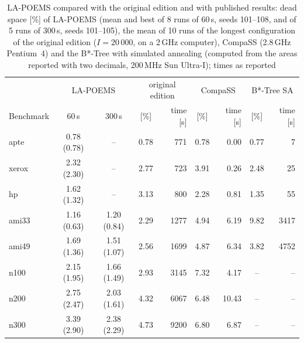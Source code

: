 \begin{table}
\centering
\small
\begin{tabular}{@{}lcccrcrcr@{}}
\toprule
 & \multicolumn{2}{c}{LA-POEMS} & \multicolumn{2}{c}{original edition} & \multicolumn{2}{c}{CompaSS \cite{compass}} & \multicolumn{2}{c}{B*-Tree SA \cite{btree}} \\
Benchmark & 60\,s & 300\,s & [\%] & time [s] & [\%] & time [s] & [\%] & time [s] \\
\midrule
apte & 0.78 (0.78) & -- & 0.78 & 771 & 0.78 & 0.00 & 0.77 & 7 \\
xerox & 2.32 (2.30) & -- & 2.77 & 723 & 3.91 & 0.26 & 2.48 & 25 \\
hp & 1.62 (1.32) & -- & 3.13 & 800 & 2.28 & 0.81 & 1.35 & 55 \\
ami33 & 1.16 (0.63) & 1.20 (0.84) & 2.29 & 1277 & 4.94 & 6.19 & 9.82 & 3417 \\
ami49 & 1.69 (1.36) & 1.51 (1.07) & 2.56 & 1699 & 4.87 & 6.34 & 3.82 & 4752 \\
n100 & 2.15 (1.95) & 1.66 (1.49) & 2.93 & 3145 & 7.32 & 4.17 & -- & -- \\
n200 & 2.75 (2.47) & 2.03 (1.61) & 4.32 & 6067 & 6.48 & 10.43 & -- & -- \\
n300 & 3.39 (2.90) & 2.38 (2.29) & 4.73 & 9200 & 6.80 & 6.87 & -- & -- \\
\bottomrule
\end{tabular}
\caption{LA-POEMS compared with the original edition and with published results: dead space [\%] of LA-POEMS (mean and best of 8 runs of 60\,s, seeds 101--108, and of 5 runs of 300\,s, seeds 101--105), the mean of 10 runs of the longest configuration of the original edition ($I = 20\,000$, on a 2\,GHz computer), CompaSS \cite{benchmcnc,benchgsrc} (2.8\,GHz Pentium~4) and the B*-Tree with simulated annealing \cite{btree} (computed from the areas reported with two decimals, 200\,MHz Sun Ultra-I); times as reported}
\label{tab:literature}
\end{table}
